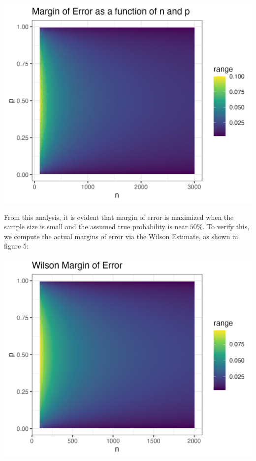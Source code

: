\documentclass{article}\usepackage[]{graphicx}\usepackage[]{xcolor}
\newenvironment{Figure}
  {\par\medskip\noindent\minipage{\linewidth}}
  {\endminipage\par\medskip}
\begin{document}
\begin{multicols}{2}
\begin{Figure}
\begin{center}
  \includegraphics[width=\textwidth]{task3.png}
\end{center} 
\end{Figure}

From this analysis, it is evident that margin of error is maximized when the sample size is small and the assumed true probability is near $50\%$. To verify this, we compute the actual margins of error via the Wilson Estimate, as shown in figure 5:

\begin{Figure}
\begin{center}
  \includegraphics[width=\textwidth]{task4.png}
\end{center} 
\end{Figure}


\end{multicols}
\end{document}
